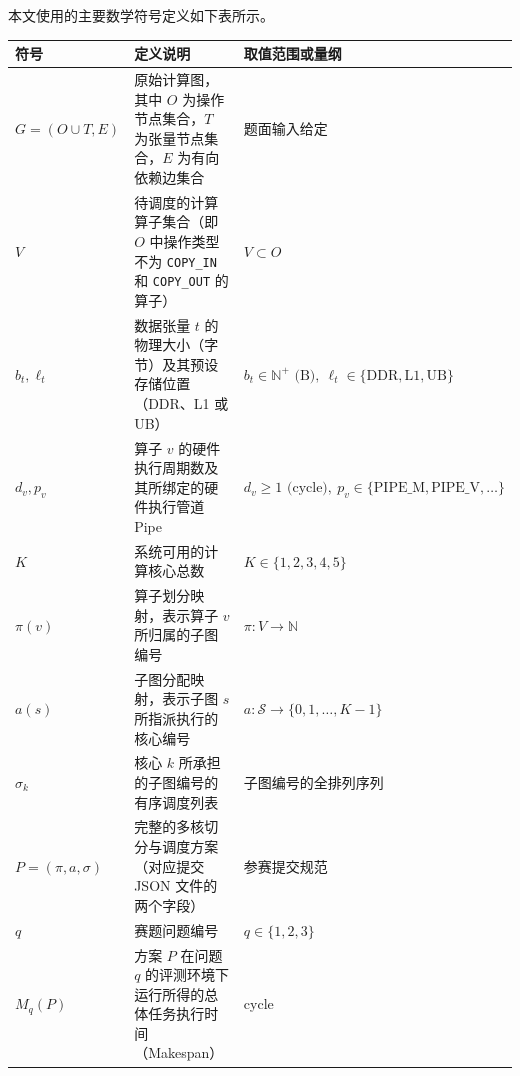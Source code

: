 \documentclass[anonymous,notoc]{gmcm2026}
\begin{document}
本文使用的主要数学符号定义如下表所示。

{\def\LTcaptype{table} %
\begin{longtable}[]{@{}
  >{\raggedright\arraybackslash}p{}
  >{\raggedright\arraybackslash}p{}
  >{\raggedright\arraybackslash}p{}@{}}
\toprule\noalign{}
\begin{minipage}[b]{\linewidth}\raggedright
符号
\end{minipage} & \begin{minipage}[b]{\linewidth}\raggedright
定义说明
\end{minipage} & \begin{minipage}[b]{\linewidth}\raggedright
取值范围或量纲
\end{minipage} \\
\midrule\noalign{}
\endhead
\bottomrule\noalign{}
\endlastfoot
\(G=(O\cup T, E)\) & 原始计算图，其中 \(O\) 为操作节点集合，\(T\) 为张量节点集合，\(E\) 为有向依赖边集合 & 题面输入给定 \\
\(V\) & 待调度的计算算子集合（即 \(O\) 中操作类型不为 \texttt{COPY\_IN} 和 \texttt{COPY\_OUT} 的算子） & \(V \subset O\) \\
\(b_t, \ell_t\) & 数据张量 \(t\) 的物理大小（字节）及其预设存储位置（DDR、L1 或 UB） & \(b_t \in \mathbb{N}^+ \text{ (B)},\ \ell_t \in \{\text{DDR}, \text{L1}, \text{UB}\}\) \\
\(d_v, p_v\) & 算子 \(v\) 的硬件执行周期数及其所绑定的硬件执行管道 Pipe & \(d_v \ge 1 \text{ (cycle)},\ p_v \in \{\text{PIPE\_M}, \text{PIPE\_V}, \dots\}\) \\
\(K\) & 系统可用的计算核心总数 & \(K \in \{1, 2, 3, 4, 5\}\) \\
\(\pi(v)\) & 算子划分映射，表示算子 \(v\) 所归属的子图编号 & \(\pi: V \to \mathbb{N}\) \\
\(a(s)\) & 子图分配映射，表示子图 \(s\) 所指派执行的核心编号 & \(a: \mathcal{S} \to \{0, 1, \dots, K-1\}\) \\
\(\sigma_k\) & 核心 \(k\) 所承担的子图编号的有序调度列表 & 子图编号的全排列序列 \\
\(P=(\pi, a, \sigma)\) & 完整的多核切分与调度方案（对应提交 JSON 文件的两个字段） & 参赛提交规范 \\
\(q\) & 赛题问题编号 & \(q \in \{1, 2, 3\}\) \\
\(M_q(P)\) & 方案 \(P\) 在问题 \(q\) 的评测环境下运行所得的总体任务执行时间（Makespan） & cycle \\

\end{longtable}}
\end{document}
